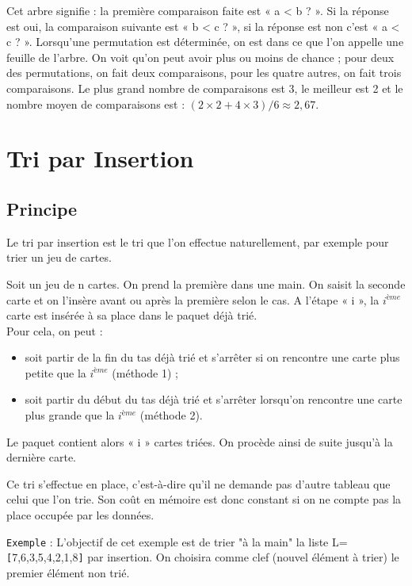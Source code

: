 \documentclass[t,11pt]{article}
\begin{document}
\noindent
Cet arbre signifie : la première comparaison faite est « a < b ? ». Si la réponse est oui, la
comparaison suivante est « b < c ? », si la réponse est non c'est « a < c ? ». Lorsqu’une permutation est déterminée, on est dans ce que l'on appelle une feuille de l'arbre. On voit qu'on peut avoir plus
ou moins de chance ; pour deux des permutations, on fait deux comparaisons, pour les quatre
autres, on fait trois comparaisons. Le plus grand nombre de comparaisons est 3, le meilleur est
2 et le nombre moyen de comparaisons est : $(2 \times 2 + 4 \times 3) / 6 \approx 2,67$.

\newpage

\section{Tri par Insertion}
\subsection{Principe}

Le tri par insertion est le tri que l'on effectue naturellement, par exemple pour trier un jeu de cartes.

Soit un jeu de n cartes. On prend la première dans une main. On saisit la seconde carte et on l'insère avant ou après la première selon le cas.
A l'étape « i », la $i^{ème}$ carte est insérée à sa place dans le paquet déjà trié.\\
Pour cela, on peut :
\begin{itemize}
\item soit partir de la fin du tas déjà trié et s'arrêter si on rencontre une carte plus petite que la $i^{ème}$ (méthode 1) ;
\item 	soit partir du début du tas déjà trié et s'arrêter lorsqu'on rencontre une carte plus grande que la $i^{ème}$ (méthode 2).
\end{itemize}
	
Le paquet contient alors « i » cartes triées. On procède ainsi de suite jusqu'à la dernière carte.

Ce tri s'effectue en place, c'est-à-dire qu'il ne demande pas d'autre tableau que celui que l'on trie. 
Son coût en mémoire est donc constant si on ne compte pas la place occupée par les données.

\vspace*{0.5cm}
\texttt{Exemple} : L'objectif de cet exemple est de trier "à la main" la liste L=\verb![!7,6,3,5,4,2,1,8\verb!]! par insertion.
On choisira comme clef (nouvel élément à trier) le premier élément non trié. 
\begin{python}

\vspace*{13cm}

\end{python}
\end{document}
